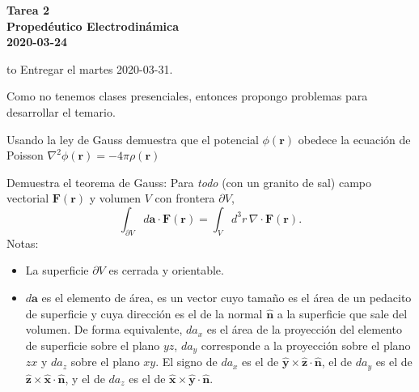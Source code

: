 \documentclass{exam}
\begin{document}
\begin{center}
\bf\large Tarea 2\\
Propedéutico Electrodinámica\\
2020-03-24
\\[20pt]
\end{center}
\hbox to \textwidth{Nombre: \enspace\hrulefill}
Entregar el martes 2020-03-31.

Como no tenemos clases presenciales, entonces propongo problemas para
desarrollar el temario.

\begin{questions}
  \question Usando la ley de Gauss demuestra que el potencial
  $\phi(\bm r)$ obedece la ecuación de Poisson $\nabla^2\phi(\bm
  r)=-4\pi\rho(\bm r)$

  \question Demuestra el teorema de Gauss: Para {\em todo} (con un
  granito de sal) campo vectorial $\bm F(\bm r)$ y volumen $V$
  con frontera $\partial V$,
  $$
  \int_{\partial V}d\bm a\cdot\bm F(\bm r)=\int_V d^3 r\, \nabla\cdot\bm
  F(\bm r).
  $$
  Notas:
  \begin{itemize}
  \item La superficie $\partial V$ es cerrada y orientable.
  \item $d\bm a$ es el elemento de área, es un vector cuyo tamaño es
    el área de un pedacito de superficie y cuya dirección es el de la
    normal $\hat {\bm n}$ a
    la superficie que sale del volumen. De forma equivalente, $da_x$
    es el área de la proyección del elemento de
    superficie sobre el plano $yz$, $da_y$ corresponde a la proyección
    sobre el plano $zx$ y $da_z$ sobre el plano $xy$. El signo de
    $da_x$ es el de $\hat{\bm  y}\times\hat{\bm z}\cdot\hat{\bm  n}$,
    el de $da_y$ es el de $\hat{\bm  z}\times\hat {\bm x}\cdot\hat{\bm
      n}$,
    y el de $da_z$ es el de $\hat{\bm  x}\times\hat{\bm  y}\cdot\hat{\bm n}$.
  \end{itemize}


\end{questions}
\end{document}
